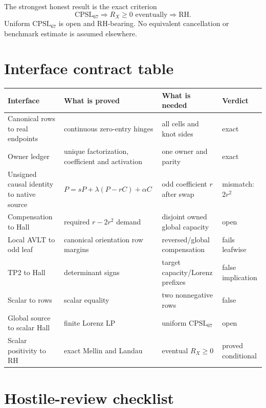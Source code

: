 \documentclass[11pt]{article}
\newcommand{\RH}{\mathrm{RH}}
\newcommand{\CPSL}{\mathrm{CPSL}_{67}}
\newcommand{\1}{\mathbf 1}
\begin{document}
The strongest honest result is the exact criterion
\[
\boxed{\CPSL\Longrightarrow R_X\ge0\text{ eventually}\Longrightarrow\RH.}
\]
Uniform $\CPSL$ is open and RH-bearing.  No equivalent cancellation or benchmark estimate is assumed elsewhere.

\appendix
\section{Interface contract table}

\begin{longtable}{p{}p{}p{}p{}}
\toprule
Interface & What is proved & What is needed & Verdict\\
\midrule
Canonical rows to real endpoints & continuous zero-entry hinges & all cells and knot sides & exact\\
Owner ledger & unique factorization, coefficient and activation & one owner and parity & exact\\
Unsigned causal identity to native source & $P=sP+\lambda(P-rC)+\alpha C$ & odd coefficient $r$ after swap & mismatch: $2r^2$\\
Compensation to Hall & required $r-2r^2$ demand & disjoint owned global capacity & open\\
Local AVLT to odd leaf & canonical orientation row margins & reversed/global compensation & fails leafwise\\
TP2 to Hall & determinant signs & target capacity/Lorenz prefixes & false implication\\
Scalar to rows & scalar equality & two nonnegative rows & false\\
Global source to scalar Hall & finite Lorenz LP & uniform $\CPSL$ & open\\
Scalar positivity to RH & exact Mellin and Landau & eventual $R_X\ge0$ & proved conditional\\
\bottomrule
\end{longtable}

\section{Hostile-review checklist}
\end{document}
